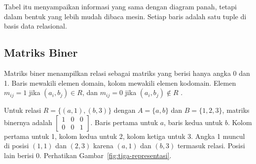\documentclass[11pt,a4paper]{article}
\begin{document}
Tabel itu menyampaikan informasi yang sama dengan diagram panah, tetapi dalam bentuk yang lebih mudah dibaca mesin. Setiap baris adalah satu tuple di basis data relasional.

\subsection{Matriks Biner}

Matriks biner menampilkan relasi sebagai matriks yang berisi hanya angka 0 dan 1. Baris mewakili elemen domain, kolom mewakili elemen kodomain. Elemen $m_{ij}=1$ jika $(a_i,b_j) \in R$, dan $m_{ij}=0$ jika $(a_i,b_j) \notin R$ \cite{rosen}.

Untuk relasi $R=\{(a,1),(b,3)\}$ dengan $A=\{a,b\}$ dan $B=\{1,2,3\}$, matriks binernya adalah $\begin{bmatrix}1&0&0\\0&0&1\end{bmatrix}$. Baris pertama untuk $a$, baris kedua untuk $b$. Kolom pertama untuk 1, kolom kedua untuk 2, kolom ketiga untuk 3. Angka 1 muncul di posisi $(1,1)$ dan $(2,3)$ karena $(a,1)$ dan $(b,3)$ termasuk relasi. Posisi lain berisi 0. Perhatikan Gambar~\ref{fig:tiga-representasi}.
\end{document}
